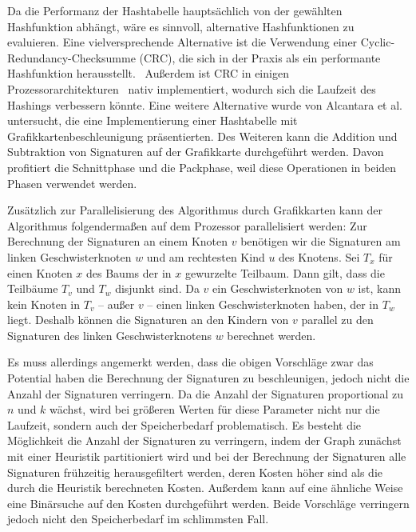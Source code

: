 Da die Performanz der Hashtabelle hauptsächlich von der gewählten Hashfunktion abhängt, wäre es sinnvoll, alternative Hashfunktionen zu evaluieren.
Eine vielversprechende Alternative ist die Verwendung einer Cyclic\hyp Redundancy\hyp Checksumme (CRC), die sich in der Praxis als ein performante Hashfunktion herausstellt.~\cite{MPL09, Hua+11}
Außerdem ist CRC in einigen Prozessorarchitekturen~\cite{SSE} nativ implementiert, wodurch sich die Laufzeit des Hashings verbessern könnte.
Eine weitere Alternative wurde von Alcantara et al.~\cite{Alc+09} untersucht, die eine Implementierung einer Hashtabelle mit Grafikkartenbeschleunigung präsentierten.
Des Weiteren kann die Addition und Subtraktion von Signaturen auf der Grafikkarte durchgeführt werden.
Davon profitiert die Schnittphase und die Packphase, weil diese Operationen in beiden Phasen verwendet werden.

Zusätzlich zur Parallelisierung des Algorithmus durch Grafikkarten kann der Algorithmus folgendermaßen auf dem Prozessor parallelisiert werden:
Zur Berechnung der Signaturen an einem Knoten $v$ benötigen wir die Signaturen am linken Geschwisterknoten $w$ und am rechtesten Kind $u$ des Knotens.
Sei $T_x$ für einen Knoten $x$ des Baums der in $x$ gewurzelte Teilbaum.
Dann gilt, dass die Teilbäume $T_v$ und $T_w$ disjunkt sind.
Da $v$ ein Geschwisterknoten von $w$ ist, kann kein Knoten in $T_v$ -- außer $v$ -- einen linken Geschwisterknoten haben, der in $T_w$ liegt.
Deshalb können die Signaturen an den Kindern von $v$ parallel zu den Signaturen des linken Geschwisterknotens $w$ berechnet werden.

Es muss allerdings angemerkt werden, dass die obigen Vorschläge zwar das Potential haben die Berechnung der Signaturen zu beschleunigen, jedoch nicht die Anzahl der Signaturen verringern.
Da die Anzahl der Signaturen proportional zu $n$ und $k$ wächst, wird bei größeren Werten für diese Parameter nicht nur die Laufzeit, sondern auch der Speicherbedarf problematisch.
Es besteht die Möglichkeit die Anzahl der Signaturen zu verringern, indem der Graph zunächst mit einer Heuristik partitioniert wird und bei der Berechnung der Signaturen alle Signaturen frühzeitig herausgefiltert werden, deren Kosten höher sind als die durch die Heuristik berechneten Kosten.
Außerdem kann auf eine ähnliche Weise eine Binärsuche auf den Kosten durchgeführt werden.
Beide Vorschläge verringern jedoch nicht den Speicherbedarf im schlimmsten Fall.
